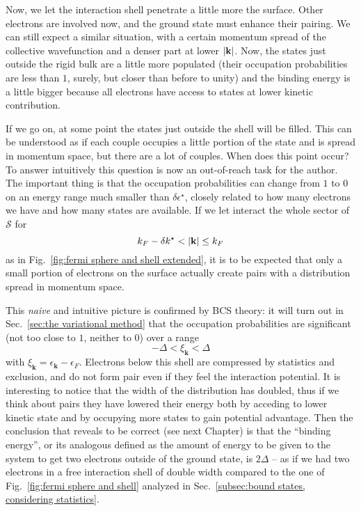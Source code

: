 Now, we let the interaction shell penetrate a little more the surface. Other electrons are involved now, and the ground state must enhance their pairing. We can still expect a similar situation, with a certain momentum spread of the collective wavefunction and a denser part at lower $\abs{\mathbf{k}}$. Now, the states just outside the rigid bulk are a little more populated (their occupation probabilities are less than $1$, surely, but closer than before to unity) and the binding energy is a little bigger because all electrons have access to states at lower kinetic contribution.

If we go on, at some point the states just outside the shell will be filled. This can be understood as if each couple occupies a little portion of the state and is spread in momentum space, but there are a lot of couples. When does this point occur? To answer intuitively this question is now an out-of-reach task for the author. The important thing is that the occupation probabilities can change from $1$ to $0$ on an energy range much smaller than $\delta\epsilon^\star$, closely related to how many electrons we have and how many states are available. If we let interact the whole sector of $\mathcal{S}$ for
\[
	k_F - \delta k^\star < \abs{\mathbf{k}} \le k_F
\]
as in Fig.~\ref{fig:fermi sphere and shell extended}, it is to be expected that only a small portion of electrons on the surface actually create pairs with a distribution spread in momentum space.

This \textit{naive} and intuitive picture is confirmed by BCS theory: it will turn out in Sec.~\ref{sec:the variational method} that the occupation probabilities are significant (not too close to $1$, neither to $0$) over a range
\[
	- \Delta < \xi_\mathbf{k} < \Delta
\]
with $\xi_\mathbf{k} = \epsilon_\mathbf{k} - \epsilon_F$. Electrons below this shell are compressed by statistics and exclusion, and do not form pair even if they feel the interaction potential. It is interesting to notice that the width of the distribution has doubled, thus if we think about pairs they have lowered their energy both by acceding to lower kinetic state and by occupying more states to gain potential advantage. Then the conclusion that reveals to be correct (see next Chapter) is that the ``binding energy'', or its analogous defined as the amount of energy to be given to the system to get two electrons outside of the ground state, is $2\Delta$ -- as if we had two electrons in a free interaction shell of double width compared to the one of Fig.~\ref{fig:fermi sphere and shell} analyzed in Sec.~\ref{subsec:bound states, considering statistics}.

